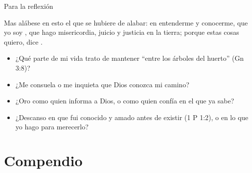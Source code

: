 \begin{frame}{Para la reflexión}
\begin{cita}Mas alábese en esto el que se hubiere de alabar: en entenderme y conocerme, que yo soy \SENOR{}, que hago misericordia, juicio y justicia en la tierra; porque estas cosas quiero, dice \SENOR{}.\end{cita}
\small
\begin{itemize}
\item ¿Qué parte de mi vida trato de mantener ``entre los árboles del huerto'' (Gn 3:8)?
\item ¿Me consuela o me inquieta que Dios conozca mi camino?
\item ¿Oro como quien informa a Dios, o como quien confía en el que ya sabe?
\item ¿Descanso en que fui conocido y amado antes de existir (1 P 1:2), o en lo que yo hago para merecerlo?
\end{itemize}
\end{frame}

\section{Compendio}

